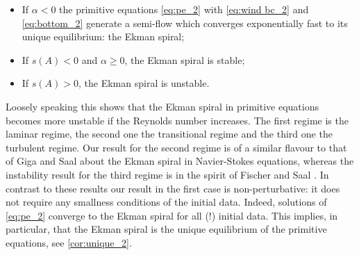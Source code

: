 \documentclass[preprint]{elsarticle}
\numberwithin{equation}{section}
\newcommand{\btb}{\color{black}}
\newcommand{\etb}{\color{black}}
\begin{document}
\begin{itemize}
	\item If $\alpha < 0$ 
	the primitive equations \eqref{eq:pe_2} with \eqref{eq:wind bc_2} and \eqref{eq:bottom_2}
	generate a semi-flow which converges exponentially fast to its unique equilibrium: the Ekman spiral;
	\item If $s(A) < 0$ and $\alpha \geq 0$, the Ekman spiral is stable;
	\item If $s(A) > 0$, the Ekman spiral is unstable. 
\end{itemize}
%
%
%
Loosely speaking this shows that the Ekman spiral in primitive equations becomes more unstable if the Reynolds number increases. The first regime is the laminar regime, the second one the transitional regime and the third one the turbulent regime. 
%
%
% 
Our result for the second regime is of a similar flavour to that of Giga and Saal \cite{GS:15_2} about the Ekman spiral in Navier-Stokes equations, whereas the instability result for the third regime is in the spirit of Fischer and Saal \cite{FS:13_2}.
In contrast to these results our result in the first case is non-perturbative: it does not require any smallness conditions of the initial data. Indeed, solutions of \eqref{eq:pe_2} converge to the Ekman spiral for all (!) initial data. This implies, in particular, that the Ekman spiral is the unique equilibrium of the primitive equations, see \autoref{cor:unique_2}.  
\end{document}
